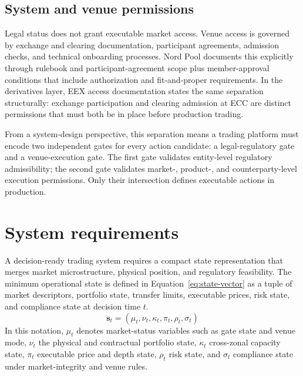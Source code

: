\documentclass[oneside,10pt]{swissi}
\begin{document}
\subsection{System and venue permissions}
Legal status does not grant executable market access. Venue access is governed by exchange and clearing documentation, participant agreements, admission checks, and technical onboarding processes. Nord Pool documents this explicitly through rulebook and participant-agreement scope plus member-approval conditions that include authorization and fit-and-proper requirements.\cite{nord_pool_rules_regulations_2026,nord_pool_general_terms_conditions_2024} In the derivatives layer, EEX access documentation states the same separation structurally: exchange participation and clearing admission at ECC are distinct permissions that must both be in place before production trading.\cite{eex_access_trading_2026}

From a system-design perspective, this separation means a trading platform must encode two independent gates for every action candidate: a legal-regulatory gate and a venue-execution gate. The first gate validates entity-level regulatory admissibility; the second gate validates market-, product-, and counterparty-level execution permissions. Only their intersection defines executable actions in production.

\bigskip

\section{System requirements}
A decision-ready trading system requires a compact state representation that merges market microstructure, physical position, and regulatory feasibility. The minimum operational state is defined in Equation~\eqref{eq:state-vector} as a tuple of market descriptors, portfolio state, transfer limits, executable prices, risk state, and compliance state at decision time $t$.
\begin{equation}
\mathbf{s}_t = \left(\mu_t,\nu_t,\kappa_t,\pi_t,\rho_t,\sigma_t\right)
\label{eq:state-vector}
\end{equation}
In this notation, $\mu_t$ denotes market-status variables such as gate state and venue mode, $\nu_t$ the physical and contractual portfolio state, $\kappa_t$ cross-zonal capacity state, $\pi_t$ executable price and depth state, $\rho_t$ risk state, and $\sigma_t$ compliance state under market-integrity and venue rules.\cite{acer_market_coupling_development_2026,acer_nemo_designation_2026,ec_network_codes_2026,eu_reg_2011_1227_remit}
\end{document}
